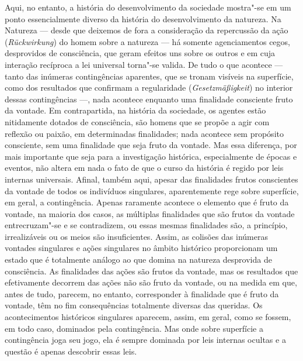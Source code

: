 Aqui, no entanto, a história do desenvolvimento da sociedade mostra"-se
em um ponto essencialmente diverso da história do desenvolvimento da
natureza. Na Natureza --- desde que deixemos de fora a consideração da
repercussão da ação (\emph{Rückwirkung}) do homem sobre a natureza --- há
somente agenciamentos cegos, desprovidos de consciência, que geram
efeitos uns sobre os outros e em cuja interação recíproca a lei
universal torna"-se valida. De tudo o que acontece --- tanto das inúmeras
contingências aparentes, que se tronam visíveis na superfície, como dos
resultados que confirmam a regularidade (\emph{Gesetzmäßigkeit}) no
interior dessas contingências ---, nada acontece enquanto uma finalidade
consciente fruto da vontade. Em contrapartida, na história da sociedade,
os agentes estão nitidamente dotados de consciência, são homens que se
propõe a agir com reflexão ou paixão, em determinadas finalidades; nada
acontece sem propósito consciente, sem uma finalidade que seja fruto da
vontade. Mas essa diferença, por mais importante que seja para a
investigação histórica, especialmente de épocas e eventos, não altera em
nada o fato de que o curso da história é regido por leis internas
universais. Afinal, também aqui, apesar das finalidades frutos
conscientes da vontade de todos os indivíduos singulares, aparentemente
rege sobre superfície, em geral, a contingência. Apenas raramente
acontece o elemento que é fruto da vontade, na maioria dos casos, as
múltiplas finalidades que são frutos da vontade entrecruzam"-se e se
contradizem, ou essas mesmas finalidades são, a princípio, irrealizáveis
ou os meios são insuficientes. Assim, as colisões das inúmeras vontades
singulares e ações singulares no âmbito histórico proporcionam um estado
que é totalmente análogo ao que domina na natureza desprovida de
consciência. As finalidades das ações são frutos da vontade, mas os
resultados que efetivamente decorrem das ações não são fruto da vontade,
ou na medida em que, antes de tudo, parecem, no entanto, corresponder à
finalidade que é fruto da vontade, têm no fim consequências totalmente
diversas das queridas. Os acontecimentos históricos singulares aparecem,
assim, em geral, como se fossem, em todo caso, dominados pela
contingência. Mas onde sobre superfície a contingência joga seu jogo,
ela é sempre dominada por leis internas ocultas e a questão é apenas
descobrir essas leis.

